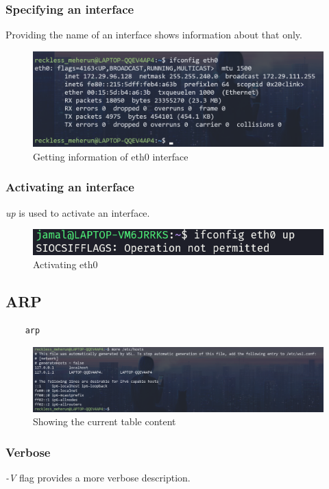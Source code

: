\documentclass[11pt]{article}
\begin{document}
\subsubsection*{Specifying an interface}
Providing the name of an interface shows information about that only.
\begin{figure}[H]
\centering
\includegraphics[width=\textwidth]{res/ifconfig 3.png}
\caption{Getting information of eth0 interface}
\end{figure}

\subsubsection*{Activating an interface}
\emph{up} is used to activate an interface.
\begin{figure}[H]
\centering
\includegraphics[width=\textwidth]{res/ifconfig 4.png}
\caption{Activating eth0}
\end{figure}

\subsection{ARP}
\begin{verbatim}
	arp
\end{verbatim}
\begin{figure}[H]
\centering
\includegraphics[width=\textwidth]{res/arp 1.png}
\caption{Showing the current table content}
\end{figure}

\subsubsection*{Verbose}
\emph{-V} flag provides a more verbose description.
\end{document}
